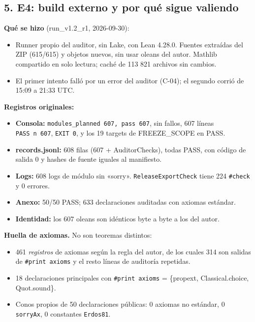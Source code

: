 \documentclass[
]{article}
\providecommand{\tightlist}{%
  \setlength{\itemsep}{0pt}\setlength{\parskip}{0pt}}
\begin{document}
\subsection{5. E4: build externo y por qué sigue
valiendo}\label{5-e4-build-externo-y-por-quuxe9-sigue-valiendo}

\textbf{Qué se hizo} (run\_v1.2\_r1, 2026-09-30):

\begin{itemize}
\tightlist
\item
  Runner propio del auditor, sin Lake, con Lean 4.28.0. Fuentes
  extraídas del ZIP (615/615) y objetos nuevos, sin usar oleans del
  autor. Mathlib compartido en solo lectura; caché de 113 821 archivos
  sin cambios.
\item
  El primer intento falló por un error del auditor (C-04); el segundo
  corrió de 15:09 a 21:33 UTC.
\end{itemize}

\textbf{Registros originales:}

\begin{itemize}
\tightlist
\item
  \textbf{Consola:} \texttt{modules\_planned\ 607,\ pass\ 607}, sin
  fallos, 607 líneas \texttt{PASS\ n\ 607}, \texttt{EXIT\ 0}, y los 19
  targets de FREEZE\_SCOPE en PASS.
\item
  \textbf{records.jsonl:} 608 filas (607 + AuditorChecks), todas PASS,
  con código de salida 0 y hashes de fuente iguales al manifiesto.
\item
  \textbf{Logs:} 608 logs de módulo sin «sorry».
  \texttt{ReleaseExportCheck} tiene 224 \texttt{\#check} y 0 errores.
\item
  \textbf{Anexo:} 50/50 PASS; 633 declaraciones auditadas con axiomas
  estándar.
\item
  \textbf{Identidad:} los 607 oleans son idénticos byte a byte a los del
  autor.
\end{itemize}

\textbf{Huella de axiomas.} No son teoremas distintos:

\begin{itemize}
\tightlist
\item
  461 \emph{registros} de axiomas según la regla del autor, de los
  cuales 314 son salidas de \texttt{\#print\ axioms} y el resto líneas
  de auditoría repetidas.
\item
  18 declaraciones principales con \texttt{\#print\ axioms} = \{propext,
  Classical.choice, Quot.sound\}.
\item
  Conos propios de 50 declaraciones públicas: 0 axiomas no estándar, 0
  \texttt{sorryAx}, 0 constantes \texttt{Erdos81}.
\end{itemize}
\end{document}
